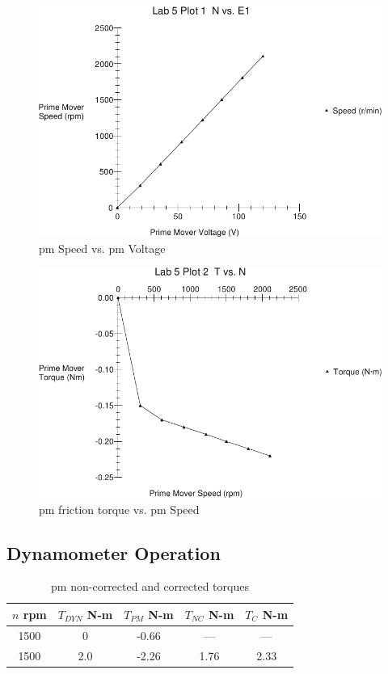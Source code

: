 \documentclass{article}
\begin{document}
\begin{figure}[H]
  \centering
  \includegraphics[width=\textwidth]{img/plot1}
  \caption{\gls{pm} Speed vs. \gls{pm} Voltage}
  \label{fig:plot_01}
\end{figure}

\begin{figure}[H]
  \centering
  \includegraphics[width=\textwidth]{img/plot2}
  \caption{\gls{pm} friction torque vs. \gls{pm} Speed}
  \label{fig:plot_02}
\end{figure}

\subsection{Dynamometer Operation}

\begin{table}[H]
  \centering
  \begin{tabular}{*{5}{c}}
    $n$ rpm & $T_{DYN}$ N-m& $T_{PM}$ N-m & $T_{NC}$ N-m & $T_C$ N-m \\
    \hline
    1500 &   0 & -0.66 &  --- &  --- \\
    1500 & 2.0 & -2.26 & 1.76 & 2.33 \\
  \end{tabular}
  \caption{\gls{pm} non-corrected and corrected torques}
  \label{tab:table_03}
\end{table}
\end{document}
